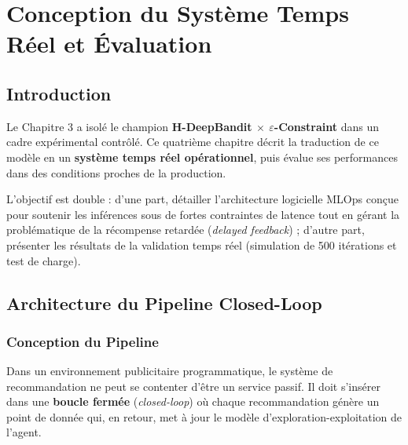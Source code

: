 
\chapter{Conception du Système Temps Réel et Évaluation}
\label{chap:systeme_temps_reel}

\section*{Introduction}

Le Chapitre 3 a isolé le champion \textbf{H-DeepBandit $\times$ $\varepsilon$-Constraint} dans un cadre expérimental contrôlé. Ce quatrième chapitre décrit la traduction de ce modèle en un \textbf{système temps réel opérationnel}, puis évalue ses performances dans des conditions proches de la production.

L'objectif est double : d'une part, détailler l'architecture logicielle MLOps conçue pour soutenir les inférences sous de fortes contraintes de latence tout en gérant la problématique de la récompense retardée (\textit{delayed feedback}) ; d'autre part, présenter les résultats de la validation temps réel (simulation de 500 itérations et test de charge).


\section{Architecture du Pipeline Closed-Loop}
\label{sec:architecture_pipeline}

\subsection{Conception du Pipeline}

Dans un environnement publicitaire programmatique, le système de recommandation ne peut se contenter d'être un service passif. Il doit s'insérer dans une \textbf{boucle fermée} (\textit{closed-loop}) où chaque recommandation génère un point de donnée qui, en retour, met à jour le modèle d'exploration-exploitation de l'agent.

